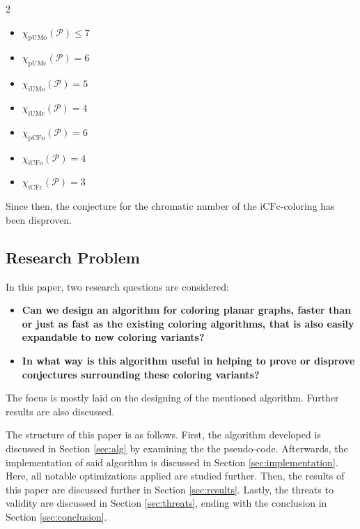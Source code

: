 \documentclass{article}
\begin{document}
\begin{minipage}{0.45\textwidth}
	\raggedcolumns
	\begin{multicols}{2}
		\begin{itemize}
			\item $\chi_{\mathrm{pUMo}}(\mathcal{P}) \leq 7$
			\item $\chi_{\mathrm{pUMc}}(\mathcal{P}) = 6$
			\item $\chi_{\mathrm{iUMo}}(\mathcal{P}) = 5$
			\item $\chi_{\mathrm{iUMc}}(\mathcal{P}) = 4$
			\item $\chi_{\mathrm{pCFo}}(\mathcal{P}) = 6$
			\item $\chi_{\mathrm{iCFo}}(\mathcal{P}) = 4$
			\item $\chi_{\mathrm{iCFc}}(\mathcal{P}) = 3$
		\end{itemize}
	\end{multicols}
\end{minipage}
\vspace{0.4cm}

Since then, the conjecture for the chromatic number of the $\mathrm{iCFc}$-coloring has been disproven.


\subsection{Research Problem}

In this paper, two research questions are considered:

\begin{itemize}
	\item \textbf{Can we design an algorithm for coloring planar graphs, faster than or just as fast as the existing coloring algorithms, that is also easily expandable to new coloring variants?}
	\item \textbf{In what way is this algorithm useful in helping to prove or disprove conjectures surrounding these coloring variants?}
\end{itemize}

The focus is mostly laid on the designing of the mentioned algorithm. Further results are also discussed.

The structure of this paper is as follows. First, the algorithm developed is discussed in Section \ref{sec:alg} by examining the the pseudo-code. Afterwards, the implementation of said algorithm is discussed in Section \ref{sec:implementation}. Here, all notable optimizations applied are studied further. Then, the results of this paper are discussed further in Section \ref{sec:results}. Lastly, the threats to validity are discussed in Section \ref{sec:threats}, ending with the conclusion in Section \ref{sec:conclusion}.
\end{document}

